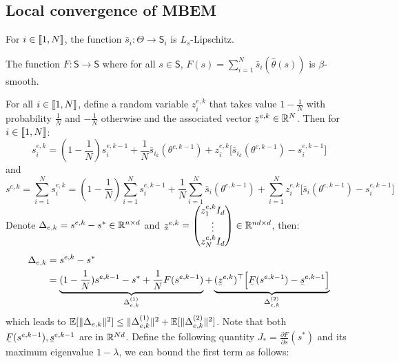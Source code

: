 \subsection{Local convergence of MBEM}
\begin{assumption}
For $i \in \llbracket1,N\rrbracket$,  the function $\bar{s}_i: \Theta \to \mathsf{S}_i$ is $L_s$-Lipschitz.
\end{assumption}

\begin{assumption}
The function $F: \mathsf{S} \to \mathsf{S}$ where for all $s \in  \mathsf{S}$, $F(s) = \sum_{i=1}^N \bar{s}_i (\hat{\theta}(s))$ is $\beta$-smooth.
\end{assumption}
For all $i \in \llbracket1,N\rrbracket$, define a random variable $z_i^{e,k}$ that takes value $1-\frac{1}{N}$ with probability $\frac{1}{N}$ and $-\frac{1}{N}$ otherwise and the associated vector $\barbelow{z}^{e,k} \in \rset^N$. Then for $i \in \llbracket1,N\rrbracket$:
\begin{equation}
s_i^{e,k} = (1-\frac{1}{N}) s_i^{e,k-1} + \frac{1}{N}\bar{s}_{i_k}(\theta^{e,k-1}) + z_i^{e,k} \Big[\bar{s}_{i_k}(\theta^{e,k-1}) - s_i^{e,k-1}\Big]
\end{equation}
and
\begin{equation}
s^{e,k} =  \sum_{i=1}^N s_i^{e,k} = (1-\frac{1}{N})  \sum_{i=1}^N s_i^{e,k-1} + \frac{1}{N}  \sum_{i=1}^N \bar{s}_i(\theta^{e,k-1}) +  \sum_{i=1}^N z_i^{e,k} \Big[\bar{s}_i(\theta^{e,k-1}) - s_i^{e,k-1}\Big]
\end{equation}
Denote $\Delta_{e,k} = s^{e,k} - s^* \in \mathbb{R}^{n \times d}$ and  $\barbelow{z}^{e,k} = \begin{pmatrix} 
z_1^{e,k}I_d  \\
\vdots  \\
z_N^{e,k}I_d
\end{pmatrix} \in \rset^{nd \times d}$, then:
\begin{equation}
\begin{split}
\Delta_{e,k} & = s^{e,k} - s^* \\
& = \underbrace{(1-\frac{1}{N}) s^{e,k-1} - s^*  +  \frac{1}{N}  F(s^{e,k-1})}_{\Delta_{e,k}^{(1)}}  + \underbrace{(\barbelow{z}^{e,k})^\top \Big[ \barbelow{F}(s^{e,k-1}) - \barbelow{s}^{e,k-1} \Big]}_{\Delta_{e,k}^{(2)}}
\end{split}
\end{equation}
which leads to $\operatorname*{\mathbb{E}}[\lVert\Delta_{e,k}\rVert^2] \leq \lVert\Delta_{e,k}^{(1)}\rVert^2 + \operatorname*{\mathbb{E}}[\lVert\Delta_{e,k}^{(2)}\rVert^2] $. Note that both $\barbelow{F}(s^{e,k-1}), \barbelow{s}^{e,k-1}$ are in $\mathbb{R}^{Nd}$.
Define the following quantity $J_* = \frac{\partial F}{\partial s}(s^*)$ and its maximum eigenvalue $1-\lambda$, we can bound the first term as follows:
